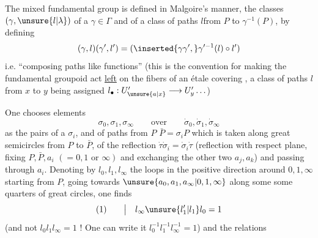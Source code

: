 The mixed fundamental group is defined in Malgoire's manner,  the classes $(\gamma,\unsure{l|\lambda})$ of a $\gamma\in\Gamma$ and of a class of paths $l$\unsure{/|)}from $P$ to $\gamma^{-1}(P)$, by defining
\[
(\gamma,l)(\gamma',l')=(\inserted{\gamma\gamma',}\gamma'^{-1}(l)\circ l')
\]
i.e. ``composing paths like functions'' (this is the convention for making the fundamental groupoid act \uline{ left} on the fibers of an étale covering , a class of paths $l$ from $x$ to $y$ being assigned $l_\bullet:U'_{\unsure{a|x}}\longrightarrow U'_y\ldots$)

One chooses elements
\[
\sigma_0,\sigma_1,\sigma_\infty\qquad\text{over}\qquad\dot\sigma_0,\dot\sigma_1,\dot\sigma_\infty
\]
as the pairs of a $\sigma_i$, and of paths  from $P$  $\bar P=\sigma_iP$ which is taken along   great semicircles from $P$ to $\bar P$,    of the reflection $\dot\tau\dot\sigma_i=\dot\sigma_i\dot\tau$ (reflection with respect  plane, fixing $P,\bar P,a_i$ $(=0,1\text{ or }\infty)$ and exchanging the other two $a_j,a_k$) and  passing through $a_i$.  Denoting by $l_0,l_1,l_\infty$  the loops in the positive direction around $0,1,\infty$ starting from $P$, going towards $\unsure{a_0,a_1,a_\infty|0,1,\infty}$ along some some quarters of great circles, one finds
\[
(1)\qquad\big|\quad l_\infty\unsure{l'_1|l_1}l_0=1
\]
(and not $l_0l_1l_\infty=1$ !  One can write it $l_0^{-1}l_1^{-1}l_\infty^{-1}=1$)
and the relations
